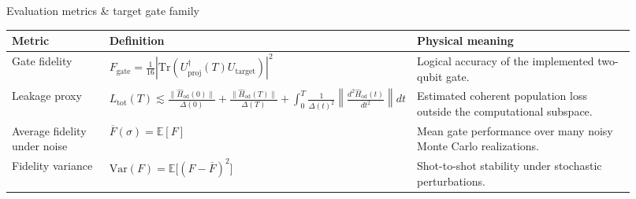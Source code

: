 \documentclass{beamer}
\newcommand{\presenterbox}[1]{%
\begin{tikzpicture}[remember picture,overlay]
    \node[anchor=south east, xshift=-0.0cm, yshift=0.3cm] at (current page.south east) {%
        \tikz{\node[fill=blue!80, rounded corners=3pt, inner sep=3pt]{\color{white}\small\bfseries #1};}%
    };
\end{tikzpicture}%
}
\begin{document}
\begin{frame}{Evaluation metrics \& target gate family}
\scriptsize
\begin{tabular}{p{0.18\linewidth} p{0.32\linewidth} p{0.42\linewidth}}
\toprule
\textbf{Metric} & \textbf{Definition} & \textbf{Physical meaning} \\
\midrule
Gate fidelity &
\( \scriptstyle
F_{\mathrm{gate}}=
\frac{1}{16}\left|
\mathrm{Tr}\!\left(
U_{\mathrm{proj}}^\dagger(T)U_{\mathrm{target}}
\right)\right|^2
\)
&
Logical accuracy of the implemented two-qubit gate. \\[1em]

Leakage proxy &
\( \scriptstyle
L_{\mathrm{tot}}(T)\lesssim
\frac{\|\hat{H}_{\mathrm{od}}(0)\|}{\Delta(0)}
+
\frac{\|\hat{H}_{\mathrm{od}}(T)\|}{\Delta(T)}
+
\int_{0}^{T}
\frac{1}{\Delta(t)^2}
\left\|
\frac{d^2 \hat{H}_{\mathrm{od}}(t)}{dt^2}
\right\|dt
\)
&
Estimated coherent population loss outside the computational subspace. \\[3em]

Average fidelity under noise &
\( \scriptstyle
\overline{F}(\sigma)=
\mathbb{E}[F]
\)
&
Mean gate performance over many noisy Monte Carlo realizations. \\[1em]

Fidelity variance &
\( \scriptstyle
\mathrm{Var}(F)=\mathbb{E}\big[(F-\overline{F})^2\big]
\)
&
Shot-to-shot stability under stochastic perturbations. \\[1em]
\bottomrule
\end{tabular}


\let\thefootnote\relax{}
\end{frame}
\end{document}

